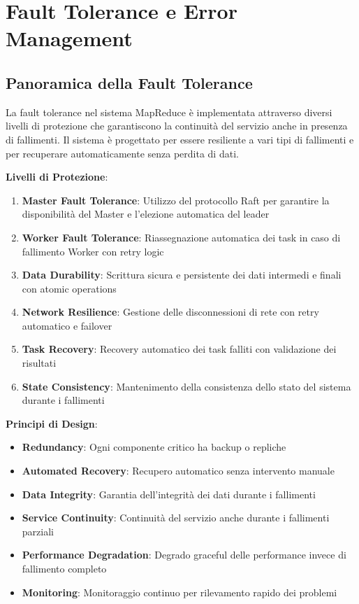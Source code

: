 \documentclass[12pt,a4paper]{article}
\begin{document}
\section{Fault Tolerance e Error Management}

\subsection{Panoramica della Fault Tolerance}

La fault tolerance nel sistema MapReduce è implementata attraverso diversi livelli di protezione che garantiscono la continuità del servizio anche in presenza di fallimenti. Il sistema è progettato per essere resiliente a vari tipi di fallimenti e per recuperare automaticamente senza perdita di dati.

\textbf{Livelli di Protezione}:

\begin{enumerate}
\item \textbf{Master Fault Tolerance}: Utilizzo del protocollo Raft per garantire la disponibilità del Master e l'elezione automatica del leader
\item \textbf{Worker Fault Tolerance}: Riassegnazione automatica dei task in caso di fallimento Worker con retry logic
\item \textbf{Data Durability}: Scrittura sicura e persistente dei dati intermedi e finali con atomic operations
\item \textbf{Network Resilience}: Gestione delle disconnessioni di rete con retry automatico e failover
\item \textbf{Task Recovery}: Recovery automatico dei task falliti con validazione dei risultati
\item \textbf{State Consistency}: Mantenimento della consistenza dello stato del sistema durante i fallimenti
\end{enumerate}

\textbf{Principi di Design}:

\begin{itemize}
\item \textbf{Redundancy}: Ogni componente critico ha backup o repliche
\item \textbf{Automated Recovery}: Recupero automatico senza intervento manuale
\item \textbf{Data Integrity}: Garantia dell'integrità dei dati durante i fallimenti
\item \textbf{Service Continuity}: Continuità del servizio anche durante i fallimenti parziali
\item \textbf{Performance Degradation}: Degrado graceful delle performance invece di fallimento completo
\item \textbf{Monitoring}: Monitoraggio continuo per rilevamento rapido dei problemi
\end{itemize}
\end{document}
